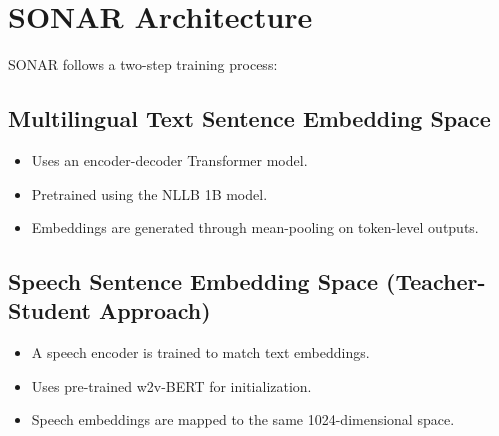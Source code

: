 \section{SONAR Architecture}
SONAR follows a two-step training process:

\subsection{Multilingual Text Sentence Embedding Space}
\begin{itemize}
    \item Uses an encoder-decoder Transformer model.
    \item Pretrained using the NLLB 1B model.
    \item Embeddings are generated through mean-pooling on token-level outputs.
\end{itemize}

\subsection{Speech Sentence Embedding Space (Teacher-Student Approach)}
\begin{itemize}
    \item A speech encoder is trained to match text embeddings.
    \item Uses pre-trained w2v-BERT for initialization.
    \item Speech embeddings are mapped to the same 1024-dimensional space.
\end{itemize}

